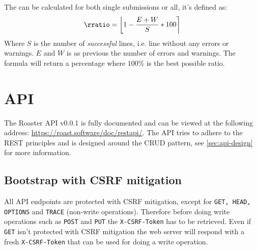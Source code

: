 \documentclass[12pt,a4paper]{report}
\begin{document}
The \rratio can be calculated for both single submissions or all, it's defined as:
\begin{equation*}
    \text{\rratio} = \left\lfloor 1 - \frac{E + W}{S} * 100 \right\rceil
\end{equation*}
Where $S$ is the number of \textit{successful} lines, i.e. line without any errors or warnings. $E$ and $W$ is as previous the number of errors and warnings. The \rratio formula will return a percentage where $100 \%$ is the best possible ratio.




\chapter{API}
The Roaster API v0.0.1 is fully documented and can be viewed at the following address: \url{https://roast.software/doc/restapi/}. The API tries to adhere to the REST principles and is designed around the CRUD pattern, see \autoref{sec:api-design} for more information.

\section{Bootstrap with CSRF mitigation}
\label{sec:api-bootstrap}
All API endpoints are protected with CSRF mitigation, except for \texttt{GET, HEAD, OPTIONS} and \texttt{TRACE} (non-write operations). Therefore before doing write operations such as \texttt{POST} and \texttt{PUT} the \texttt{X-CSRF-Token} has to be retrieved. Even if \texttt{GET} isn't protected with CSRF mitigation the web server will respond with a fresh \texttt{X-CSRF-Token} that can be used for doing a write operation.
\end{document}

